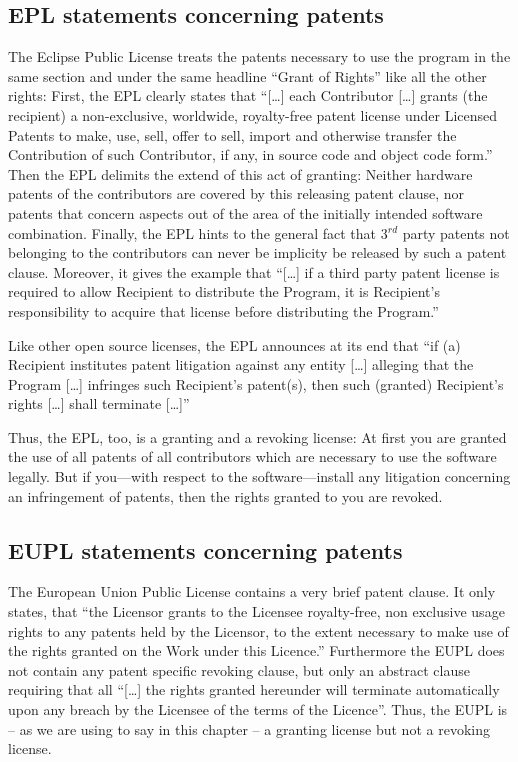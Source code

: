 \subsection{EPL statements concerning patents}

The Eclipse Public License treats the patents necessary to use the program
in the same section and under the same headline \enquote{Grant of Rights} like
all the other rights: First, the EPL clearly states that \enquote{[\ldots] each
Contributor [\ldots] grants (the recipient) a non-exclusive, worldwide,
royalty-free patent license under Licensed Patents to make, use, sell, offer to
sell, import and otherwise transfer the Contribution of such Contributor, if
any, in source code and object code form.} Then the EPL delimits
the extend of this act of granting: Neither hardware patents of the contributors
are covered by this releasing patent clause, nor patents that concern aspects
out of the area of the initially intended software combination.
Finally, the EPL hints to the general fact that 3$^{rd}$ party patents not
belonging to the contributors can never be implicity be released by such a
patent clause. Moreover, it gives the example that \enquote{[\ldots] if a third
party patent license is required to allow Recipient to distribute the Program,
it is Recipient's responsibility to acquire that license before distributing the
Program.}

Like other open source licenses, the EPL announces at its end that
\enquote{if (a) Recipient institutes patent litigation against any entity
[\ldots] alleging that the Program [\ldots] infringes such Recipient's
patent(s), then such (granted) Recipient's rights [\ldots] shall terminate
[\ldots]}

Thus, the EPL, too, is a granting and a revoking license: 
At first you are granted the use of all patents of all
contributors which are necessary to use the software legally. But if you---with
respect to the software---install any litigation concerning an infringement of
patents, then the rights granted to you are revoked.

\subsection{EUPL statements concerning patents}

The European Union Public License contains a very brief patent clause. It only
states, that \enquote{the Licensor grants to the Licensee royalty-free, non
exclusive usage rights to any patents held by the Licensor, to the extent
necessary to make use of the rights granted on the Work under this
Licence.}
Furthermore the EUPL does not contain any patent specific revoking clause, but
only an abstract clause requiring that all \enquote{[\ldots] the rights granted
hereunder will terminate automatically upon any breach by the Licensee of the
terms of the Licence}. Thus, the EUPL is -- as we are using to say
in this chapter -- a granting license but not a revoking license.

